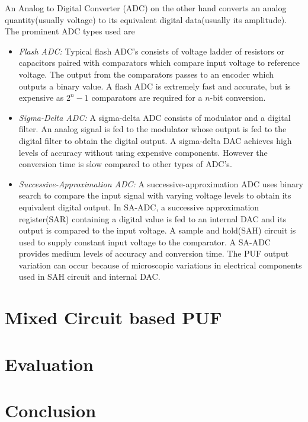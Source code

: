 An Analog to Digital Converter (ADC) on the other hand converts an analog quantity(usually voltage) to its equivalent digital data(usually its amplitude). The prominent ADC types used are
\begin{itemize}
\item \textit{Flash ADC:} Typical flash ADC's consists of voltage ladder of resistors or capacitors paired with comparators which compare input voltage to reference voltage. The output from the comparators passes to an encoder which outputs a binary value. A flash ADC is extremely fast and accurate, but is expensive as $2^{n}-1$ comparators are required for a $n$-bit conversion.
\item \textit{Sigma-Delta ADC:} A sigma-delta ADC consists of modulator and a digital filter. An analog signal is fed to the modulator whose output is fed to the digital filter to obtain the digital output. A sigma-delta DAC achieves high levels of accuracy without using expensive components. However the conversion time is slow compared to other types of ADC's.
\item \textit{Successive-Approximation ADC:} A successive-approximation ADC uses binary search to compare the input signal with varying voltage levels to obtain its equivalent digital output. In SA-ADC, a successive approximation register(SAR) containing a digital value is fed to an internal DAC and its output is compared to the input voltage. A sample and hold(SAH) circuit is used to supply constant input voltage to the comparator. A SA-ADC provides medium levels of accuracy and conversion time. The PUF output variation can occur because of microscopic variations in electrical components used in SAH circuit and internal DAC.

\end{itemize}

\section{Mixed Circuit based PUF}


\section{Evaluation}

\section{Conclusion}
